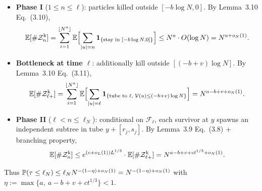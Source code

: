 \begin{itemize}
    \item \textbf{Phase I} ($1\le n\le \ell$): particles killed outside $[-b\log N,0]$. By Lemma~3.10 Eq.~(3.10),
    \[
        \E[\#\mathcal Z^{\mathrm k}_n]
        =\sum_{i=1}^{\lfloor N^a\rfloor}\E\Bigl[\sum_{|u|=n}\one_{\{\text{stay in }[-b\log N,0]\}}\Bigr]
        \le N^a\cdot O(\log N)=N^{a+o_N(1)}.
    \]
    \item \textbf{Bottleneck at time $\ell$}: additionally kill outside $[(-b+v)\log N]$. By Lemma~3.10 Eq.~(3.11),
    \[
        \E[\#\mathcal Z^{\mathrm k}_{\ell+}]
        =\sum_{i=1}^{\lfloor N^a\rfloor}\E\Bigl[\sum_{|u|=\ell}\one_{\{\text{tube to }\ell,\;\mathcal V(u)\le(-b+v)\log N\}}\Bigr]
        =N^{a-b+v+o_N(1)}.
    \]
    \item \textbf{Phase II} ($\ell<n\le \ell_N$): conditional on $\mathcal F_\ell$, each survivor at $y$ spawns an independent subtree in tube $y+[r_j,s_j]$. By Lemma~3.9 Eq.~(3.8) + branching property,
    \[
        \E[\#\mathcal Z^{\mathrm k}_n]
        \le e^{(c+o_L(1))L^{1/3}}\cdot\E[\#\mathcal Z^{\mathrm k}_{\ell+}]
        =N^{a-b+v+ct^{1/3}+o_N(1)}.
    \]
\end{itemize}
\vspace{-1mm}
Thus $\P(\tau\le \ell_N)\le\ell_N N^{-(1-\eta)+o_N(1)}=N^{-(1-\eta)+o_N(1)}$ with $\eta:=\max\{a,\ a-b+v+ct^{1/3}\}<1$.
